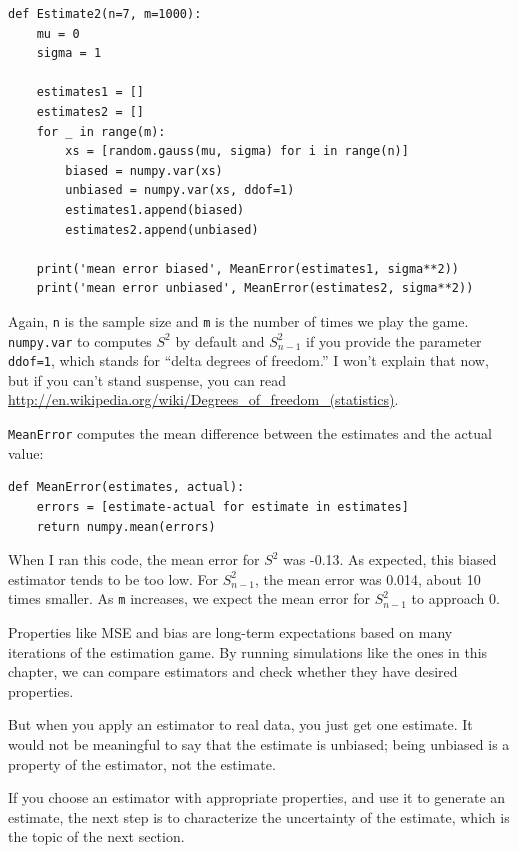 \documentclass[12pt]{book}
\begin{document}
\begin{verbatim}
def Estimate2(n=7, m=1000):
    mu = 0
    sigma = 1

    estimates1 = []
    estimates2 = []
    for _ in range(m):
        xs = [random.gauss(mu, sigma) for i in range(n)]
        biased = numpy.var(xs)
        unbiased = numpy.var(xs, ddof=1)
        estimates1.append(biased)
        estimates2.append(unbiased)

    print('mean error biased', MeanError(estimates1, sigma**2))
    print('mean error unbiased', MeanError(estimates2, sigma**2))
\end{verbatim}

Again, {\tt n} is the sample size and {\tt m} is the number of times
we play the game.  {\tt numpy.var} to computes $S^2$ by default and
$S_{n-1}^2$ if you provide the parameter {\tt ddof=1}, which stands for
``delta degrees of freedom.''  I won't explain that now, but if you
can't stand suspense, you can read
\url{http://en.wikipedia.org/wiki/Degrees_of_freedom_(statistics)}.

{\tt MeanError} computes the mean difference between the estimates
and the actual value:

\begin{verbatim}
def MeanError(estimates, actual):
    errors = [estimate-actual for estimate in estimates]
    return numpy.mean(errors)
\end{verbatim}

When I ran this code, the mean error for $S^2$ was -0.13.  As
expected, this biased estimator tends to be too low.  For $S_{n-1}^2$,
the mean error was 0.014, about 10 times smaller.  As {\tt m}
increases, we expect the mean error for $S_{n-1}^2$ to approach 0.

Properties like MSE and bias are long-term expectations based on
many iterations of the estimation game.  By running simulations like
the ones in this chapter, we can compare estimators and check whether
they have desired properties.

But when you apply an estimator to real
data, you just get one estimate.  It would not be meaningful to say
that the estimate is unbiased; being unbiased is a property of the
estimator, not the estimate.

If you choose an estimator with appropriate properties, and use it to
generate an estimate, the next step is to characterize the
uncertainty of the estimate, which is the topic of the next
section.

\end{document}
